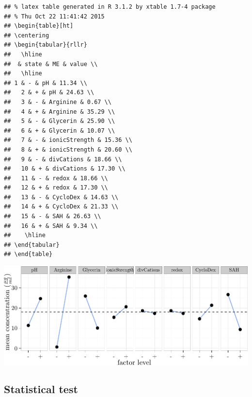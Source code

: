 \documentclass[]{article}
\begin{document}
\begin{verbatim}
## % latex table generated in R 3.1.2 by xtable 1.7-4 package
## % Thu Oct 22 11:41:42 2015
## \begin{table}[ht]
## \centering
## \begin{tabular}{rllr}
##   \hline
##  & state & ME & value \\ 
##   \hline
## 1 & - & pH & 11.34 \\ 
##   2 & + & pH & 24.63 \\ 
##   3 & - & Arginine & 0.67 \\ 
##   4 & + & Arginine & 35.29 \\ 
##   5 & - & Glycerin & 25.90 \\ 
##   6 & + & Glycerin & 10.07 \\ 
##   7 & - & ionicStrength & 15.36 \\ 
##   8 & + & ionicStrength & 20.60 \\ 
##   9 & - & divCations & 18.66 \\ 
##   10 & + & divCations & 17.30 \\ 
##   11 & - & redox & 18.66 \\ 
##   12 & + & redox & 17.30 \\ 
##   13 & - & CycloDex & 14.63 \\ 
##   14 & + & CycloDex & 21.33 \\ 
##   15 & - & SAH & 26.63 \\ 
##   16 & + & SAH & 9.34 \\ 
##    \hline
## \end{tabular}
## \end{table}
\end{verbatim}

\includegraphics{analysis_files/figure-latex/unnamed-chunk-5-1.pdf}

\subsection{Statistical test}\label{statistical-test}
\end{document}
